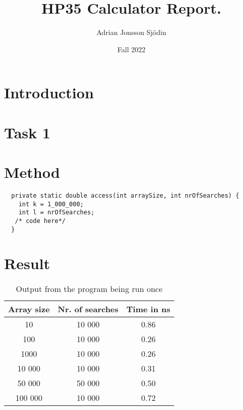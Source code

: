\documentclass[a4paper,11pt]{article}
\begin{document}
\title{
  \textbf{HP35 Calculator Report.}
}
\author{Adrian Jonsson Sjödin}
\date{Fall 2022}

\maketitle

\section*{Introduction}


\section*{Task 1}


\section*{Method}



\begin{verbatim}
  private static double access(int arraySize, int nrOfSearches) {
    int k = 1_000_000;
    int l = nrOfSearches;
   /* code here*/
  }
\end{verbatim}



\section*{Result}

\begin{table}[h]
  \begin{center}
    \begin{tabular}{|c|c|c|}
      \hline
      \textbf{Array size} & \textbf{Nr. of searches} & \textbf{Time in ns} \\
      \hline
      10                  & 10 000                   & 0.86                \\
      100                 & 10 000                   & 0.26                \\
      1000                & 10 000                   & 0.26                \\
      10 000              & 10 000                   & 0.31                \\
      50 000              & 50 000                   & 0.50                \\
      100 000             & 10 000                   & 0.72                \\
      \hline
    \end{tabular}
    \caption{Output from the program being run once}
    \label{tab:task1}
  \end{center}
\end{table}
\end{document}

